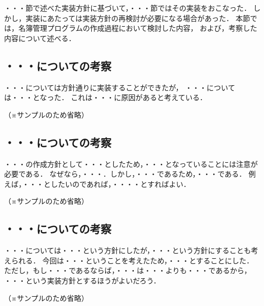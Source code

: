 \documentclass[a4j,11pt]{jarticle}
\begin{document}

・・・節で述べた実装方針に基づいて，・・・節ではその実装をおこなった．
しかし，実装にあたっては実装方針の再検討が必要になる場合があった．
本節では，名簿管理プログラムの作成過程において検討した内容，
および，考察した内容について述べる．

\subsection{・・・についての考察}

・・・については方針通りに実装することができたが，
・・・については・・・となった．
これは・・・に原因があると考えている．

（※サンプルのため省略）

\subsection{・・・についての考察}

・・・の作成方針として・・・としたため，・・・となっていることには注意が必要である．
なぜなら，・・・．しかし，・・・であるため，・・・である．
例えば，・・・としたいのであれば，・・・・とすればよい．

（※サンプルのため省略）

\subsection{・・・についての考察}

・・・については・・・という方針にしたが，・・・という方針にすることも考えられる．
今回は・・・ということを考えたため，・・・とすることにした．
ただし，もし・・・であるならば，・・・は・・・よりも・・・であるから，
・・・という実装方針とするほうがよいだろう．

（※サンプルのため省略）


\end{document}
